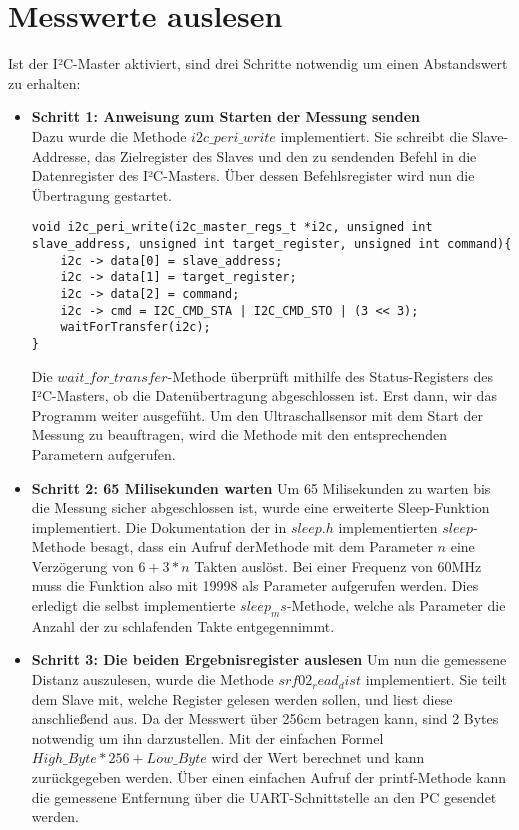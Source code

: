 \documentclass[parskip,
							 oneside,
							 11pt,
							 noheadingspace,
							 accentcolor=tud1d,
							 bigchapter,
							 colorback]{tudreport}
\begin{document}
\section{Messwerte auslesen}
Ist der I²C-Master aktiviert, sind drei Schritte notwendig um einen Abstandswert zu erhalten: 
\begin{itemize}
\item \textbf{Schritt 1: Anweisung zum Starten der Messung senden}\\
	Dazu wurde die Methode $i2c\_peri\_write$ implementiert. Sie schreibt die Slave-Addresse, das Zielregister des Slaves und den zu sendenden Befehl in die Datenregister des I²C-Masters.  Über dessen Befehlsregister wird nun die Übertragung gestartet. 
\begin{lstlisting}
void i2c_peri_write(i2c_master_regs_t *i2c, unsigned int slave_address, unsigned int target_register, unsigned int command){
	i2c -> data[0] = slave_address;
	i2c -> data[1] = target_register;
	i2c -> data[2] = command;
	i2c -> cmd = I2C_CMD_STA | I2C_CMD_STO | (3 << 3);
	waitForTransfer(i2c);
}
\end{lstlisting}

Die $wait\_for\_transfer$-Methode überprüft mithilfe des Status-Registers des I²C-Masters, ob die Datenübertragung abgeschlossen ist. Erst dann, wir das Programm weiter ausgefüht. 
Um den Ultraschallsensor mit dem Start der Messung zu beauftragen, wird die Methode mit den entsprechenden Parametern 
aufgerufen.
\item \textbf{Schritt 2: 65 Milisekunden warten}
Um 65 Milisekunden zu warten bis die Messung sicher abgeschlossen ist, wurde eine erweiterte Sleep-Funktion implementiert. Die Dokumentation der in $sleep.h$ implementierten $sleep$-Methode besagt, dass ein Aufruf derMethode mit dem Parameter $n$ eine Verzögerung von $6 + 3 * n$ Takten auslöst. Bei einer Frequenz von 60MHz muss die Funktion also mit 19998 als Parameter aufgerufen werden. Dies erledigt die selbst implementierte $sleep_ms$-Methode, welche als Parameter die Anzahl der zu schlafenden Takte entgegennimmt. 
\item \textbf{Schritt 3: Die beiden Ergebnisregister auslesen}
	Um nun die gemessene Distanz auszulesen, wurde die Methode $srf02_read_dist$ implementiert. Sie teilt dem Slave mit, welche Register gelesen werden sollen, und liest diese anschließend aus. Da der Messwert über 256cm betragen kann, sind 2 Bytes notwendig um ihn darzustellen. Mit der einfachen Formel $High\_Byte * 256 + Low\_Byte$ wird der Wert berechnet und kann zurückgegeben werden. Über einen einfachen Aufruf der printf-Methode kann die gemessene Entfernung über die UART-Schnittstelle an den PC gesendet werden. 
\end{itemize}
\end{document}
